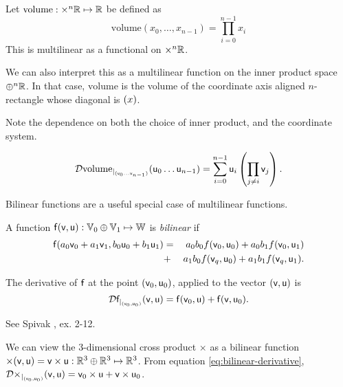 \label{sec:Canonical-vector-volume}

Let $\text{volume} : \times^{n} \mathbb{R} \mapsto \mathbb{R}$ be defined as
\begin{equation}
\text{volume} \left( x_0 , \ldots , x_{n-1} \right) = \prod_{i=0}^{n-1} x_i
\end{equation}
This is multilinear as a functional on $\times^{n} \mathbb{R}$.

We can also interpret this as a multilinear function on the
inner product space
$\oplus^{n} \mathbb{R}$.
In that case, $\text{volume}$ is the volume of the coordinate axis aligned
$n$-rectangle whose diagonal is $\mathsf{(}x)$.

Note the dependence on both the choice of inner product, 
and the coordinate system.

\begin{equation}
{\mathcal{D}{\text{volume}}_{\mid_{(\mathsf{v}_0 \ldots \mathsf{v}_{n-1})}}({\mathsf{u}_0 \ldots \mathsf{u}_{n-1}})}
 =  \sum_{i=0}^{n-1} \mathsf{u}_i \left( \prod_{j \neq i} \mathsf{v}_j \right).
\end{equation}

\label{sec:Bilinear-functions}

Bilinear functions are a useful special case of multilinear functions.

A function $\mathsf{f}(\mathsf{v},\mathsf{u}):\mathbb{V}_0 \oplus \mathbb{V}_1 \mapsto \mathbb{W}$
is \textit{bilinear} if
\begin{eqnarray}
\mathsf{f}(a_0 \mathsf{v}_0 + a_1 \mathsf{v}_1, b_0 \mathsf{u}_0 + b_1 \mathsf{u}_1)
& =  & a_0 b_0 f(\mathsf{v}_0,\mathsf{u}_0)
+  a_0 b_1 f(\mathsf{v}_0,\mathsf{u}_1)
\\
& +  & a_1 b_0 f(\mathsf{v}_q,\mathsf{u}_0)
 +  a_1 b_1 f(\mathsf{v}_q,\mathsf{u}_1).
\nonumber
\end{eqnarray}

The derivative of $\mathsf{f}$
at the point $(\mathsf{v}_0,\mathsf{u}_0)$, applied to the vector $(\mathsf{v},\mathsf{u})$ is
\begin{equation}
\label{eq:bilinear-derivative}
{\mathcal{D}{\mathsf{f}}_{\mid_{(\mathsf{v}_0,\mathsf{u}_0)}}({\mathsf{v},\mathsf{u}})} = \mathsf{f}(\mathsf{v}_0,\mathsf{u}) + \mathsf{f}(\mathsf{v},\mathsf{u}_0).
\end{equation}

See Spivak \cite{spivak-1965}, ex. 2-12.

\label{sec:cross-products}

We can view the 3-dimensional cross product
$ \times $
as a bilinear function
$\times(\mathsf{v},\mathsf{u}) = \mathsf{v} \times \mathsf{u} : \mathbb{R}^3 \oplus \mathbb{R}^3 \mapsto \mathbb{R}^3$.
From equation \ref{eq:bilinear-derivative},
${\mathcal{D}{\times}_{\mid_{(\mathsf{v}_0,\mathsf{u}_0)}}({\mathsf{v},\mathsf{u}})} = \mathsf{v}_0 \times \mathsf{u} + \mathsf{v} \times \mathsf{u}_0$.

